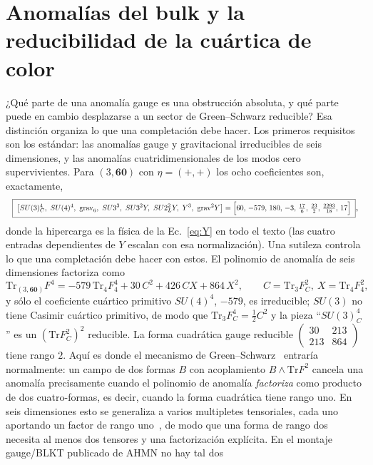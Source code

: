 \documentclass[11pt,a4paper]{article}
\newcommand{\Tr}{\mathrm{Tr}}
\begin{document}
\section{Anomal\'ias del bulk y la reducibilidad de la cu\'artica de color}\label{sec:bulkanom}
¿Qu\'e parte de una anomal\'ia gauge es una obstrucci\'on absoluta, y qu\'e parte puede en
cambio desplazarse a un sector de Green--Schwarz reducible? Esa distinci\'on organiza lo
que una completaci\'on debe hacer. Los primeros requisitos son los est\'andar: las
anomal\'ias gauge y gravitacional irreducibles de seis dimensiones, y las anomal\'ias
cuatridimensionales de los modos cero supervivientes. Para $(3,\mathbf{60})$ con
$\eta=(+,+)$ los ocho coeficientes son, exactamente,
\begin{equation}
\resizebox{\textwidth}{!}{$\displaystyle
\boxed{\;\big[SU(3)_C^4,\ SU(4)^4,\ \mathrm{grav}_6,\ SU3^3,\ SU3^2Y,\ SU2_L^2Y,\ Y^3,\
\mathrm{grav}^2Y\big]=\Big[60,\,-579,\,180,\,-3,\,\tfrac{17}{6},\,\tfrac{23}{2},\,\tfrac{2293}{18},\,17\Big]\;}$},
\end{equation}
donde la hipercarga es la f\'isica de la Ec.~\eqref{eq:Y} en todo el texto (las cuatro
entradas dependientes de $Y$ escalan con esa normalizaci\'on). Una sutileza controla lo
que una completaci\'on debe hacer con estos. El polinomio de anomal\'ia de seis
dimensiones factoriza como
\begin{equation}
\Tr_{(3,\mathbf{60})}F^4=-579\,\Tr_4 F_4^4+30\,C^2+426\,CX+864\,X^2,
\qquad C=\Tr_3 F_C^2,\ X=\Tr_4 F_4^2,
\end{equation}
y s\'olo el coeficiente cu\'artico primitivo $SU(4)^4$, $-579$, es irreducible; $SU(3)$ no
tiene Casimir cu\'artico primitivo, de modo que $\Tr_3 F_C^4=\tfrac12 C^2$ y la pieza
``$SU(3)_C^4$'' es un $(\Tr F_C^2)^2$ reducible. La forma cuadr\'atica gauge reducible
$\left(\begin{smallmatrix}30&213\\213&864\end{smallmatrix}\right)$ tiene rango $2$. Aqu\'i
es donde el mecanismo de Green--Schwarz~\cite{GreenSchwarz} entrar\'ia normalmente: un
campo de dos formas $B$ con acoplamiento $B\wedge\Tr F^2$ cancela una anomal\'ia
precisamente cuando el polinomio de anomal\'ia \emph{factoriza} como producto de dos
cuatro-formas, es decir, cuando la forma cuadr\'atica tiene rango uno. En seis dimensiones
esto se generaliza a varios multipletes tensoriales, cada uno aportando un factor de rango
uno~\cite{Sagnotti}, de modo que una forma de rango dos necesita al menos dos tensores y
una factorizaci\'on expl\'icita. En el montaje gauge/BLKT publicado de AHMN no hay tal dos
\end{document}
